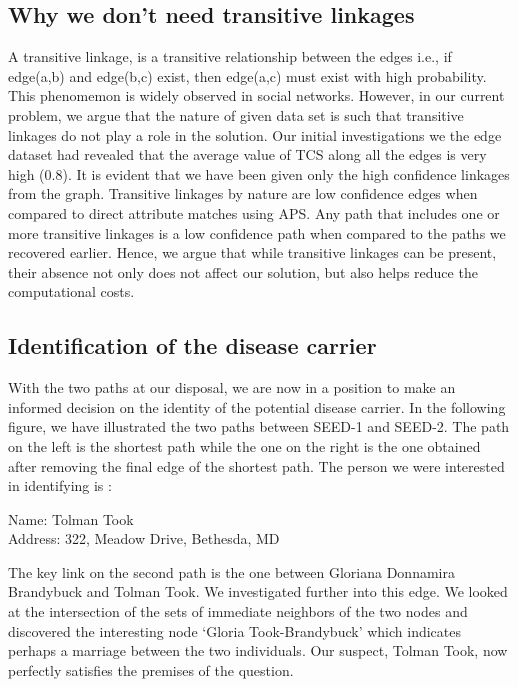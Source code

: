 \documentclass{article} %
\begin{document}
\subsection{Why we don't need transitive linkages}

A transitive linkage, is a transitive relationship between the edges i.e., if edge(a,b) and edge(b,c) exist, then edge(a,c) must exist with high probability. This phenomemon is widely observed in social networks. However, in our current problem, we argue that the nature of given data set is such that transitive linkages do not play a role in the solution. Our initial investigations we the edge dataset had revealed that the average value of TCS along all the edges is very high (0.8). It is evident that we have been given only the high confidence linkages from the graph. Transitive linkages by nature are low confidence edges when compared to direct attribute matches using APS. Any path that includes one or more transitive linkages is a low confidence path when compared to the paths we recovered earlier. Hence, we argue that while transitive linkages can be present, their absence not only does not affect our solution, but also helps reduce the computational costs.

\subsection{Identification of the disease carrier}

With the two paths at our disposal, we are now in a position to make an informed decision on the identity of the potential disease carrier. In the following figure, we have illustrated the two paths between SEED-1 and SEED-2. The path on the left is the shortest path while the one on the right is the one obtained after removing the final edge of the shortest path. The person we were interested in identifying is : 

{
Name: Tolman Took \\
Address: 322, Meadow Drive, Bethesda, MD \\
}

The key link on the second path is the one between Gloriana Donnamira Brandybuck and Tolman Took. We investigated further into this edge. We looked at the intersection of the sets of immediate neighbors of the two nodes and discovered the interesting node `Gloria Took-Brandybuck' which indicates perhaps a marriage between the two individuals. Our suspect, Tolman Took, now perfectly satisfies the premises of the question.
\end{document}
